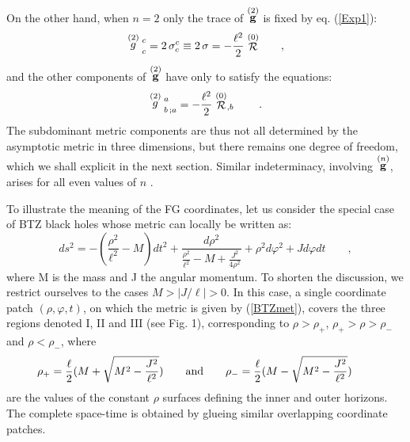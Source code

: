 \documentclass[a4paper,10pt]{article}
\begin{document}
On the other hand, when $n=2$ only the  
 trace of $\stackrel {(2)}{\bf g}$  
is fixed by eq. (\ref{Exp1}): 
\begin{equation} 
\label{sigR} 
\stackrel {(2)}{g} \strut ^{ c}_{  c}= 2\, 
\sigma^{  c}_{  c} \equiv 2 \, \sigma = -{\ell^2\over 2}\stackrel {(0)}{\cal R} 
\qquad , 
\end{equation} 
and the other components of $\stackrel {(2)}{\bf g}$ have only 
to satisfy the equations: 
\begin{equation} 
\label{divg2} 
\stackrel {(2)}g \strut ^{ a}_{ b \, ;  a} = -{\ell^2\over 2}  
\stackrel {(0)} {\cal R} _{, b } 
\qquad . 
\end{equation} 
The subdominant metric components are thus not all determined by  
the asymptotic metric in three dimensions, but there remains one 
degree of freedom, which we shall explicit in the next section. 
Similar indeterminacy, involving $\stackrel {(n)}{\bf g}$, arises 
for all even values of $n$ \cite{NB, BERS}. 
 
To illustrate the meaning of the FG coordinates,  
let us consider the special case of BTZ black 
holes \cite{BTZ} whose metric can locally be written as: 
\begin{equation} 
\label{BTZmet} 
ds^2 = -(\frac {\rho^2} {\ell^2} -M) dt^2 +  
\frac {d\rho ^2} {\frac {\rho^2} {\ell^2} -M + \frac {J^2}{ 4 \rho^2}} 
+ \rho^2 d\varphi^2 + J d\varphi dt \qquad , 
\end{equation} 
where M is the mass and J the angular momentum. To shorten the discussion,  
we restrict ourselves to 
the cases $M>|J/\ell|>0$. In this case, a single coordinate patch 
$(\rho, \varphi, t)$, on which the metric is given by (\ref{BTZmet}), covers  
the three 
regions denoted I, II and III (see Fig. 1), corresponding to $\rho>\rho_+$, 
$\rho_+>\rho>\rho_-$ and $\rho<\rho_-$, where  
\begin{equation} 
\rho_+=\frac \ell 2(M +\sqrt{M^2-\frac {J^2}{\ell^2}})\qquad {\rm and} \qquad 
 \rho_-=\frac \ell 2(M -\sqrt{M^2-\frac {J^2}{\ell^2}})\qquad  
\end{equation} 
are the values of the constant $\rho$ surfaces defining the inner  
and outer horizons. The complete space-time is obtained by glueing  
similar overlapping coordinate patches. 
 
\end{document}
